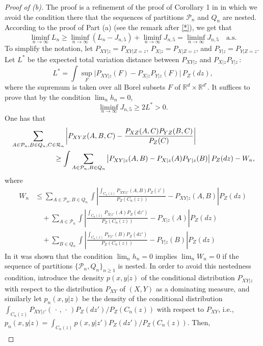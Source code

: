\documentclass[11pt]{article}
\def\Q{Q}
\def\P{\mathcal{P}}
\begin{document}
\begin{proof}[Proof of (b)] 
The proof  is a refinement of  the proof of Corollary 1 in \cite{GyWa12} in which  we avoid the condition there that the sequences of partitions $\P_n$ and $\Q_n$ are nested.
According to the proof of Part (a) (see the remark after \eqref{*}), we get that
\[
\liminf_{n\to\infty}L_n
\ge 
\liminf_{n\to\infty}(L_n-J_{n,5})
+
\liminf_{n\to\infty}J_{n,5}
=
\liminf_{n\to\infty}J_{n,5} \quad \text{a.s.} 
\]
To simplify the notation, let $P_{XY|z}=P_{XY|Z=z}$, $P_{X|z}=P_{X|Z=z}$,  and $P_{Y|z}=P_{Y|Z=z}$. 
Let $L^*$ be the expected total variation distance between  $P_{XY|z}$ and $P_{X|z} P_{Y|z}\,$:
\[
L^*=  \int \sup_F \big| P_{XY|z} (F)-P_{X|z}P_{Y|z} (F)\big| \, P_Z(dz),
\]
where the supremum is taken over all Borel subsets $F$ of $\mathbb R^d\times \mathbb R^{d'}$.
It suffices to prove that by the condition $\lim_n h_n=0$,
\[
\liminf_{n\to\infty} J_{n,5}
\ge
2L^*>0.
\]
One has that
\begin{align*}
\MoveEqLeft[6] \sum_{{A\in \P_n,B\in \Q_n,C\in {\cal R}_n}}
\left|P_{XYZ}(A,B,C)
-\frac{P_{XZ}(A,C)P_{YZ}(B,C)}{P_{Z}(C)}
\right|\\
&\ge
\int
\sum_{A\in \P_n,B\in \Q_n}\left|P_{XY|z}(A,B)
-P_{X|z}(A)P_{Y|z}(B)
\right|P_Z(dz)-W_n,
\end{align*}
where
\begin{align}
\!\!\!\! W_n
&\le
\sum_{A\in \P_n,B\in \Q_n}\int
\left|\frac{\int_{C_n(z)}P_{XY|z'}(A,B)P_Z(z')}{P_Z(C_n(z))}
-
P_{XY|z}(A,B)\right|P_Z(dz) \label{eq-ft} \\
& \quad + 
\sum_{A\in \P_n}\int
\left|\frac{\int_{C_n(z)}P_{X|z'}(A)P_Z(dz')}{P_Z(C_n(z))}
-P_{X|z}(A)
\right|P_Z(dz)  \label{eq-st} \\
 &\quad   +
\sum_{B\in \Q_n}\int
\left|\frac{\int_{C_n(z)}P_{Y|z'}(B)P_Z(dz')}{P_Z(C_n(z))}
-P_{Y|z}(B)
\right| P_Z(dz)  \label{eq-tt}
\end{align}
In  \cite{GyWa12} it was shown that the condition $\lim_n h_n=0$  implies $\lim_{n} W_n= 0$ if the sequence of partitions $\{\P_n,Q_n\}_{n\ge 1}$ is nested. 
In order to avoid this nestedness condition, introduce the density $p(x,y|z)$ of the conditional distribution $P_{XY|z}$ with respect to the distribution $P_{XY}$ of $(X,Y)$ as a dominating measure, 
and similarly let $p_n(x,y|z)$ be the density of the conditional distribution $\int_{C_n(z)}P_{XY|z'}(\,\cdot\,,\,\cdot\,)P_Z(dz')/P_Z(C_n(z))$ with respect to $P_{XY}$,
i.e., $p_n(x,y|z)=\int_{C_n(z)}p(x,y|z')P_Z(dz')/P_{Z}(C_n(z))$.
Then,
\begin{align*}

\end{align*}
\end{proof}
\end{document}
